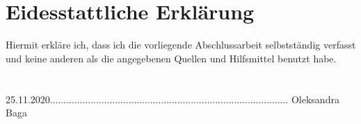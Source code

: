 \chapter*{Eidesstattliche Erklärung}
Hiermit erkläre ich, dass ich die vorliegende Abschlussarbeit selbstständig verfasst und keine
anderen als die angegebenen Quellen und Hilfsmittel benutzt habe.\\\\\\

25.11.2020........................................................................................ Oleksandra Baga






